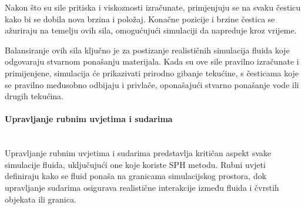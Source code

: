 \documentclass[diplomskirad]{fer}
\newcommand{\paragraphnewline}[1]{\paragraph{#1}\mbox{}\\}
\begin{document}
    Nakon što su sile pritiska i viskoznosti izračunate, primjenjuju se na svaku česticu kako bi se dobila nova brzina i položaj.
    Konačne pozicije i brzine čestica se ažuriraju na temelju ovih sila, omogućujući simulaciji da napreduje kroz vrijeme.

    Balansiranje ovih sila ključno je za postizanje realističnih simulacija fluida koje odgovaraju stvarnom ponašanju materijala.
    Kada su ove sile pravilno izračunate i primijenjene, simulacija će prikazivati prirodno gibanje tekućine, s česticama koje se pravilno međusobno odbijaju i privlače, oponašajući stvarno ponašanje vode ili drugih tekućina.

    \paragraphnewline{Upravljanje rubnim uvjetima i sudarima}
    Upravljanje rubnim uvjetima i sudarima predstavlja kritičan aspekt svake simulacije fluida, uključujući one koje koriste SPH metodu.
    Rubni uvjeti definiraju kako se fluid ponaša na granicama simulacijskog prostora, dok upravljanje sudarima osigurava realistične interakcije između fluida i čvrstih objekata ili granica.
\end{document}
